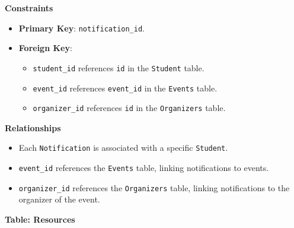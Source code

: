 \documentclass[12pt]{article}
\begin{document}
\pagebreak

\noindent
\textbf{Constraints}
\begin{itemize}
    \item \textbf{Primary Key}: \texttt{notification\_id}.

    \item \textbf{Foreign Key}: 
    \begin{itemize}
        \item \texttt{student\_id} references \texttt{id} in the \texttt{Student} table.
        \item \texttt{event\_id} references \texttt{event\_id} in the \texttt{Events} table.
        \item \texttt{organizer\_id} references \texttt{id} in the \texttt{Organizers} table.
    \end{itemize}
\end{itemize}

\noindent
\textbf{Relationships} 
\begin{itemize}
    \item Each \texttt{Notification} is associated with a specific \texttt{Student}.
    \item \texttt{event\_id} references the \texttt{Events} table, linking notifications to events.
    \item \texttt{organizer\_id} references the \texttt{Organizers} table, linking notifications to the organizer of the event.
\end{itemize}

\pagebreak

\textbf{Table: Resources} \\
\end{document}

